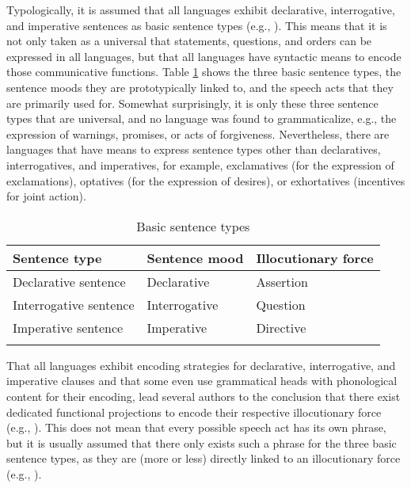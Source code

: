 Typologically, it is assumed that all languages exhibit declarative, interrogative, and imperative sentences as basic sentence types (e.g., \citealt{lyons1977semantics, sadock1985speech}). This means that it is not only taken as a universal that statements, questions, and orders can be expressed in all languages, but that all languages have syntactic means to encode those communicative functions. Table \ref{basicsentencetypes} shows the three basic sentence types, the sentence moods they are prototypically linked to, and the speech acts that they are primarily used for. Somewhat surprisingly, it is only these three sentence types that are universal, and no language was found to grammaticalize, e.g., the expression of warnings, promises, or acts of forgiveness. Nevertheless, there are languages that have means to express sentence types other than declaratives, interrogatives, and imperatives, for example, exclamatives (for the expression of exclamations), optatives (for the expression of desires), or exhortatives (incentives for joint action).

\begin{table}
\begin{tabular}{lll}
\lsptoprule
Sentence type & Sentence mood & Illocutionary force \\\midrule
Declarative sentence & Declarative & Assertion \\
Interrogative sentence & Interrogative & Question \\
Imperative sentence & Imperative & Directive \\
\lspbottomrule
\end{tabular}
\caption{Basic sentence types\label{basicsentencetypes}}
\end{table}

That all languages exhibit encoding strategies for declarative, interrogative, and imperative clauses and that some even use grammatical heads with phonological content for their encoding, lead several authors to the conclusion that there exist dedicated functional projections to encode their respective illocutionary force (e.g., \citealt{rizzi1997fine, cinque1999adverbs, ambar2003}). This does not mean that every possible speech act has its own phrase, but it is usually assumed that there only exists such a phrase for the three basic sentence types, as they are (more or less) directly linked to an illocutionary force (e.g., \citealt{speas2003configurational}).

